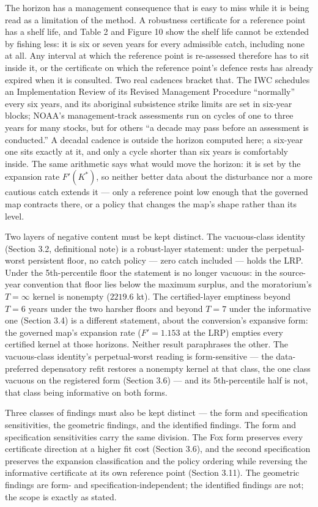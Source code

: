 The horizon has a management consequence that is easy to miss while it
is being read as a limitation of the method. A robustness certificate for a
reference point has a shelf life, and Table 2 and Figure 10 show the shelf life cannot be
extended by fishing less: it is six or seven years for every admissible
catch, including none at all. Any interval at which the reference point is
re-assessed therefore has to sit inside it, or the certificate on which the
reference point's defence rests has already expired when it is consulted.
Two real cadences bracket that. The IWC schedules an Implementation Review of
its Revised Management Procedure ``normally'' every six years, and its
aboriginal subsistence strike limits are set in six-year blocks; NOAA's
management-track assessments run on cycles of one to three years for many
stocks, but for others ``a decade may pass before an assessment is
conducted.'' A decadal cadence is outside the horizon computed here; a
six-year one sits exactly at it, and only a cycle shorter than six years is
comfortably inside. The same arithmetic says what would move the horizon:
it is set by the expansion rate \(F'(K^*)\), so neither better data about
the disturbance nor a more cautious catch extends it --- only a reference
point low enough that the governed map contracts there, or a policy that
changes the map's shape rather than its level.

Two layers of negative content must be kept distinct. The vacuous-class
identity (Section 3.2, definitional note) is a robust-layer statement:
under the perpetual-worst persistent floor, no catch policy --- zero
catch included --- holds the LRP. Under the 5th-percentile floor the
statement is no longer vacuous: in the source-year convention that floor
lies below the maximum surplus, and the moratorium's \(T=\infty\) kernel
is nonempty (\(2219.6\) kt). The certified-layer emptiness beyond
\(T = 6\) years under the two harsher floors and beyond \(T = 7\) under
the informative one (Section 3.4) is a different statement, about the
conversion's expansive form: the governed map's expansion rate
(\(F' = 1.153\) at the LRP) empties every certified kernel at those
horizons. Neither result paraphrases the other. The vacuous-class
identity's perpetual-worst reading is form-sensitive --- the
data-preferred depensatory refit restores a nonempty kernel at that
class, the one class vacuous on the registered form (Section 3.6) ---
and its 5th-percentile half is not, that class being informative on both
forms.

Three classes of findings must also be kept distinct --- the form and
specification sensitivities, the geometric findings, and the identified
findings. The form and specification sensitivities carry the same
division. The Fox form preserves every certificate direction at a higher
fit cost (Section 3.6), and the second specification preserves the
expansion classification and the policy ordering while reversing the
informative certificate at its own reference point (Section 3.11). The
geometric findings are form- and specification-independent; the
identified findings are not; the scope is exactly as stated.

